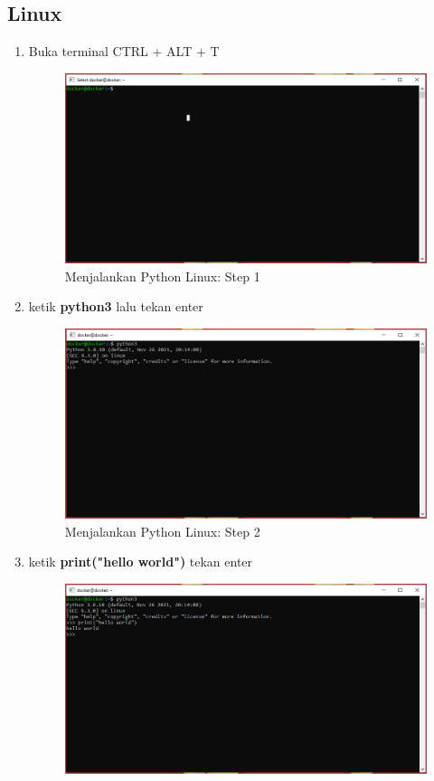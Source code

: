 \subsection{Linux}
\begin{enumerate}
\item Buka terminal CTRL + ALT + T
\begin{figure}[H]
        \centerline{\includegraphics[scale=0.5]{figures/menjalankan-python-linux/step1}}
        \caption{Menjalankan Python Linux: Step 1}
\end{figure}
\item ketik \textbf{python3} lalu tekan enter
\begin{figure}[H]
        \centerline{\includegraphics[scale=0.5]{figures/menjalankan-python-linux/step2}}
        \caption{Menjalankan Python Linux: Step 2}
\end{figure}
\item ketik \textbf{print("hello world")} tekan enter
\begin{figure}[H]
        \centerline{\includegraphics[scale=0.5]{figures/menjalankan-python-linux/step3}}

\end{figure}
\end{enumerate}
